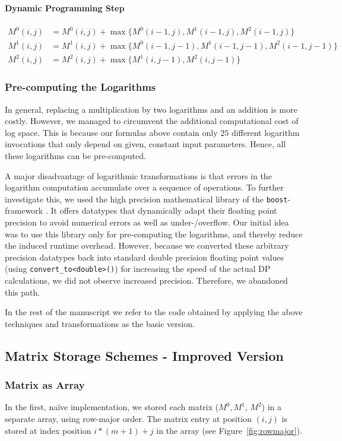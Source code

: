 \documentclass[runningheads,a4paper]{llncs}
\begin{document}
\paragraph{Dynamic Programming Step}
\begin{align*}
M^0(i,j) &= M^0(i,j) + \max\{M^0(i-1,j), M^1(i-1,j), M^2(i-1,j)\} \\
M^1(i,j) &= M^1(i,j) + \max\{M^0(i-1,j-1), M^1(i-1,j-1), M^2(i-1,j-1)\} \\
M^2(i,j) &= M^2(i,j) + \max\{M^1(i,j-1), M^2(i,j-1)\}
\end{align*}

\subsubsection{Pre-computing the Logarithms}
In general, replacing a multiplication by two logarithms and an addition is more costly.
However, we managed to circumvent the additional computational cost of log space.
This is because our formulas above contain only $25$ different logarithm invocations that only depend on given, constant input parameters.
Hence, all these logarithms can be pre-computed.

A major disadvantage of logarithmic transformations is that errors in the logarithm computation accumulate over a sequence of operations.
To further investigate this, we used the high precision mathematical library of the \texttt{boost}-framework \cite{boost}.
It offers datatypes that dynamically adapt their floating point precision to avoid numerical errors as well as under-/overflow.
Our initial idea was to use this library only for pre-computing the logarithms, and thereby reduce the induced runtime overhead.
However, because we converted these arbitrary precision datatypes back into standard double precision floating point values (using \verb|convert_to<double>()|) for 
increasing the speed of the actual DP calculations, we did not observe increased precision.
Therefore, we abandoned this path.

In the rest of the manuscript we refer to the code obtained by applying the above techniques and transformations as the basic version.

\subsection{Matrix Storage Schemes - Improved Version}
\label{sec:caching}

\subsubsection{Matrix as Array}
\label{mat-as-array}
In the first, na\"ive implementation, we stored each matrix ($M^0, M^1$, $M^2$) in a separate array, using row-major order.
The matrix entry at position $(i,j)$ is stored at index position $i*(m+1)+j$ in the array (see Figure~\ref{fig:rowmajor}).
\end{document}
